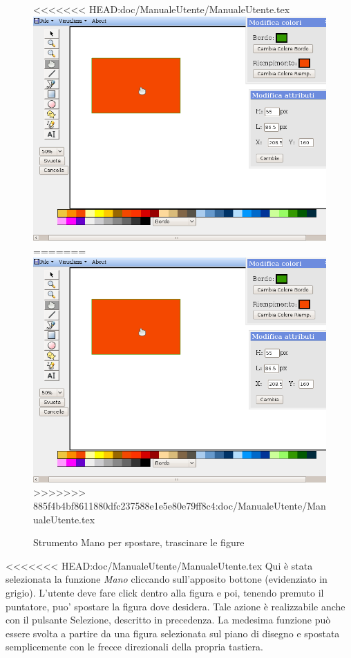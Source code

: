 \begin{figure}[!ht]
\centering
<<<<<<< HEAD:doc/ManualeUtente/ManualeUtente.tex
\includegraphics[scale=0.4]{images/mano.png}
=======
\includegraphics[scale=1]{images/mano.png}
>>>>>>> 885f4b4bf8611880dfc237588e1e5e80e79ff8c4:doc/ManualeUtente/ManualeUtente.tex
\caption{Strumento Mano per spostare, trascinare le figure}
\end{figure} 

\vspace{300pt}
<<<<<<< HEAD:doc/ManualeUtente/ManualeUtente.tex
Qui \`e stata selezionata la funzione \textit{Mano} cliccando sull'apposito bottone (evidenziato in grigio). L'utente deve fare click dentro alla figura e poi, tenendo premuto il puntatore, puo' spostare la figura dove desidera. Tale azione \`e realizzabile anche con il pulsante Selezione, descritto in precedenza. La medesima funzione pu\`o essere svolta a partire da una figura selezionata sul piano di disegno e spostata semplicemente con le frecce direzionali della propria tastiera. \\

